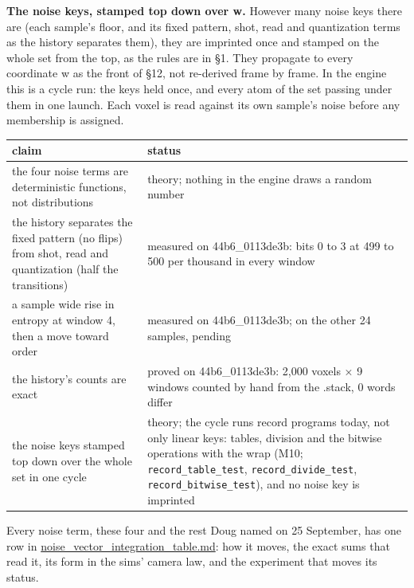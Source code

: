 \textbf{The noise keys, stamped top down over w.} However many noise keys there are (each sample's floor, and its fixed pattern, shot, read and quantization terms as the history separates them), they are imprinted once and stamped on the whole set from the top, as the rules are in §1. They propagate to every coordinate w as the front of §12, not re-derived frame by frame. In the engine this is a cycle run: the keys held once, and every atom of the set passing under them in one launch. Each voxel is read against its own sample's noise before any membership is assigned.

{\small
\setlength{\tabcolsep}{6pt}
\begin{longtable}{>{\RaggedRight\arraybackslash}p{}>{\RaggedRight\arraybackslash}p{}}
\toprule
claim & status \\
\midrule
\endhead
the four noise terms are deterministic functions, not distributions & theory; nothing in the engine draws a random number \\
the history separates the fixed pattern (no flips) from shot, read and quantization (half the transitions) & measured on 44b6\_\allowbreak{}0113de3b: bits 0 to 3 at 499 to 500 per thousand in every window \\
a sample wide rise in entropy at window 4, then a move toward order & measured on 44b6\_\allowbreak{}0113de3b; on the other 24 samples, pending \\
the history's counts are exact & proved on 44b6\_\allowbreak{}0113de3b: 2,000 voxels × 9 windows counted by hand from the .stack, 0 words differ \\
the noise keys stamped top down over the whole set in one cycle & theory; the cycle runs record programs today, not only linear keys: tables, division and the bitwise operations with the wrap (M10; \texttt{record\_\allowbreak{}table\_\allowbreak{}test}, \texttt{record\_\allowbreak{}divide\_\allowbreak{}test}, \texttt{record\_\allowbreak{}bitwise\_\allowbreak{}test}), and no noise key is imprinted \\
\bottomrule
\end{longtable}
}

Every noise term, these four and the rest Doug named on 25 September, has one row in \hyperref[chap:noise-vector-integration-table]{noise\_\allowbreak{}vector\_\allowbreak{}integration\_\allowbreak{}table.md}: how it moves, the exact sums that read it, its form in the sims' camera law, and the experiment that moves its status.

